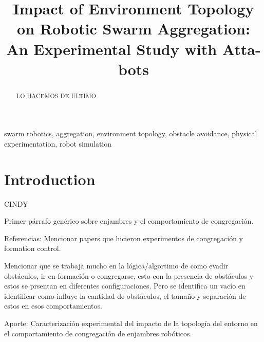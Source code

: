 \documentclass[conference]{IEEEtran}
\begin{document}
\title{Impact of Environment Topology on Robotic Swarm Aggregation: An Experimental Study with Atta-bots}

\author{
}


\maketitle

\begin{abstract}
LO HACEMOS DE ULTIMO

\end{abstract}

\begin{IEEEkeywords}
swarm robotics, aggregation, environment topology, obstacle avoidance, physical experimentation, robot simulation
\end{IEEEkeywords}

\section{Introduction}
CINDY 

Primer párrafo genérico sobre enjambres y el comportamiento de congregación. 

Referencias: Mencionar papers que hicieron experimentos de congregación y formation control. 

Mencionar que se trabaja mucho en la lógica/algortimo de como evadir obstáculos, ir en formación o congregarse, esto con la presencia de obstáculos y estos se prsentan en diferentes configuraciones. Pero se identifica un vacío en identificar como influye la cantidad de obstáculos, el tamaño y separación de estos en esos comportamientos.

Aporte: Caracterización experimental del impacto de la topología del entorno en el comportamiento de congregación de enjambres robóticos. 
\end{document}
